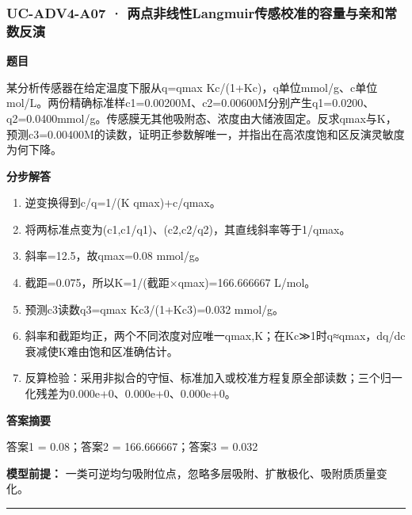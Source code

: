 \documentclass[UTF8,11pt,a4paper]{ctexart}
\begin{document}
\subsubsection*{UC-ADV4-A07 · 两点非线性Langmuir传感校准的容量与亲和常数反演}
\noindent\textbf{题目}\par
某分析传感器在给定温度下服从q=qmax Kc/(1+Kc)，q单位mmol/g、c单位mol/L。两份精确标准样c1=0.00200M、c2=0.00600M分别产生q1=0.0200、q2=0.0400mmol/g。传感膜无其他吸附态、浓度由大储液固定。反求qmax与K，预测c3=0.00400M的读数，证明正参数解唯一，并指出在高浓度饱和区反演灵敏度为何下降。\par
\medskip\noindent\textbf{分步解答}
\begin{enumerate}
\item 逆变换得到c/q=1/(K qmax)+c/qmax。
\item 将两标准点变为(c1,c1/q1)、(c2,c2/q2)，其直线斜率等于1/qmax。
\item 斜率=12.5，故qmax=0.08 mmol/g。
\item 截距=0.075，所以K=1/(截距×qmax)=166.666667 L/mol。
\item 预测c3读数q3=qmax Kc3/(1+Kc3)=0.032 mmol/g。
\item 斜率和截距均正，两个不同浓度对应唯一qmax,K；在Kc≫1时q≈qmax，dq/dc衰减使K难由饱和区准确估计。
\item 反算检验：采用非拟合的守恒、标准加入或校准方程复原全部读数；三个归一化残差为0.000e+0、0.000e+0、0.000e+0。
\end{enumerate}
\noindent\textbf{答案摘要}\par
答案1 = 0.08；答案2 = 166.666667；答案3 = 0.032\par
\noindent\textbf{模型前提：}
一类可逆均匀吸附位点，忽略多层吸附、扩散极化、吸附质质量变化。\par
\medskip\hrule\medskip
{}
\end{document}
